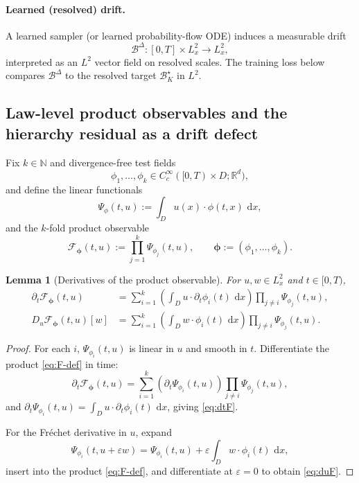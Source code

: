 \documentclass{article}
\numberwithin{equation}{section}
\theoremstyle{plain}
\newtheorem{lemma}[theorem]{Lemma}
\theoremstyle{definition}
\theoremstyle{remark}
\newcommand{\N}{\mathbb{N}}
\newcommand{\R}{\mathbb{R}}
\newcommand{\dd}{\,\mathrm{d}}
\begin{document}
\paragraph{Learned (resolved) drift.}
A learned sampler (or learned probability-flow ODE) induces a measurable drift
\[
\mathcal B^\Delta:[0,T]\times L^2_x\to L^2_x,
\]
interpreted as an $L^2$ vector field on resolved scales. The training loss below compares $\mathcal B^\Delta$ to the resolved
target $\mathcal B^\star_K$ in $L^2$.

\subsection{Law-level product observables and the hierarchy residual as a drift defect}

Fix $k\in\N$ and divergence-free test fields
\[
\phi_1,\dots,\phi_k\in C_c^\infty([0,T)\times D;\R^d),
\]
and define the linear functionals
\begin{equation}\label{eq:Psi-def}
\Psi_{\phi}(t,u):=\int_D u(x)\cdot\phi(t,x)\,\dd x,
\end{equation}
and the $k$-fold product observable
\begin{equation}\label{eq:F-def}
\mathcal F_{\boldsymbol\phi}(t,u):=\prod_{j=1}^k \Psi_{\phi_j}(t,u),
\qquad \boldsymbol\phi:=(\phi_1,\dots,\phi_k).
\end{equation}

\begin{lemma}[Derivatives of the product observable]\label{lem:derivF}
For $u,w\in L^2_x$ and $t\in[0,T)$,
\begin{align}
\partial_t \mathcal F_{\boldsymbol\phi}(t,u)
&=\sum_{i=1}^k \left(\int_D u\cdot \partial_t\phi_i(t)\,\dd x\right)\prod_{j\ne i}\Psi_{\phi_j}(t,u),
\label{eq:dtF}\\
D_u\mathcal F_{\boldsymbol\phi}(t,u)[w]
&=\sum_{i=1}^k \left(\int_D w\cdot \phi_i(t)\,\dd x\right)\prod_{j\ne i}\Psi_{\phi_j}(t,u).
\label{eq:duF}
\end{align}
\end{lemma}

\begin{proof}
For each $i$, $\Psi_{\phi_i}(t,u)$ is linear in $u$ and smooth in $t$.
Differentiate the product \eqref{eq:F-def} in time:
\[
\partial_t\mathcal F_{\boldsymbol\phi}(t,u)=\sum_{i=1}^k \left(\partial_t\Psi_{\phi_i}(t,u)\right)\prod_{j\ne i}\Psi_{\phi_j}(t,u),
\]
and $\partial_t\Psi_{\phi_i}(t,u)=\int_D u\cdot\partial_t\phi_i(t)\,\dd x$, giving \eqref{eq:dtF}.

For the Fr\'echet derivative in $u$, expand
\[
\Psi_{\phi_i}(t,u+\varepsilon w)=\Psi_{\phi_i}(t,u)+\varepsilon\int_D w\cdot\phi_i(t)\,\dd x,
\]
insert into the product \eqref{eq:F-def}, and differentiate at $\varepsilon=0$ to obtain \eqref{eq:duF}.
\end{proof}
\end{document}
